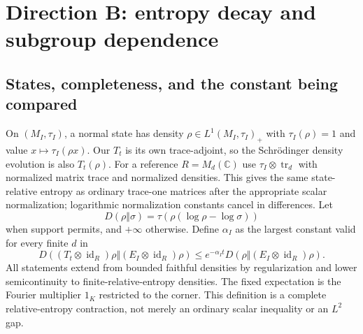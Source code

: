 \documentclass[11pt]{article}
\theoremstyle{remark}\newtheorem{remark}[definition]{Remark}
\newcommand{\id}{\operatorname{id}}
\newcommand{\C}{\mathbb{C}}
\begin{document}
\section{Direction B: entropy decay and subgroup dependence}
\subsection{States, completeness, and the constant being compared}
On $(M_I,\tau_I)$, a normal state has density
$\rho\in L^1(M_I,\tau_I)_+$ with $\tau_I(\rho)=1$ and value
$x\mapsto\tau_I(\rho x)$. Our $T_t$ is its own trace-adjoint, so the
Schr\"odinger density evolution is also $T_t(\rho)$.
For a reference $R=M_d(\C)$ use $\tau_I\otimes\operatorname{tr}_d$
with normalized matrix trace and normalized densities. This gives the
same state-relative entropy as ordinary trace-one matrices after the
appropriate scalar normalization; logarithmic normalization constants
cancel in differences. Let
\[
 D(\rho\Vert\sigma)=\tau(\rho(\log\rho-\log\sigma))
\]
when support permits, and $+\infty$ otherwise. Define $\alpha_I$ as the
largest constant valid for every finite $d$ in
\begin{equation}\label{eq:entropy}
 D((T_t\otimes\id_R)\rho\Vert(E_I\otimes\id_R)\rho)
 \leq e^{-\alpha_I t}
 D(\rho\Vert(E_I\otimes\id_R)\rho).
\end{equation}
All statements extend from bounded faithful densities by regularization
and lower semicontinuity to finite-relative-entropy densities.
The fixed expectation is the Fourier multiplier $1_K$ restricted to the
corner. This definition is a complete relative-entropy contraction, not
merely an ordinary scalar inequality or an $L^2$ gap.
\end{document}
